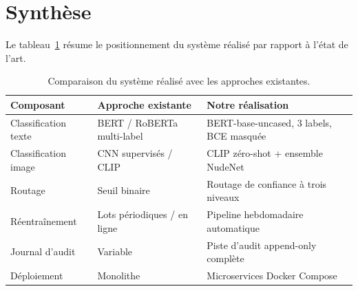 \section{Synthèse}

Le tableau~\ref{tab:sota_comparison} résume le positionnement du système réalisé par rapport à l'état de l'art.

\begin{table}[H]
\centering
\caption{Comparaison du système réalisé avec les approches existantes.}
\label{tab:sota_comparison}
\small
\begin{tabularx}{\textwidth}{lXX}
\toprule
\textbf{Composant} & \textbf{Approche existante} & \textbf{Notre réalisation} \\
\midrule
Classification texte & BERT / RoBERTa multi-label & BERT-base-uncased, 3 labels, BCE masquée \\
Classification image & CNN supervisés / CLIP & CLIP zéro-shot + ensemble NudeNet \\
Routage & Seuil binaire & Routage de confiance à trois niveaux \\
Réentraînement & Lots périodiques / en ligne & Pipeline hebdomadaire automatique \\
Journal d'audit & Variable & Piste d'audit append-only complète \\
Déploiement & Monolithe & Microservices Docker Compose \\
\bottomrule
\end{tabularx}
\end{table}
